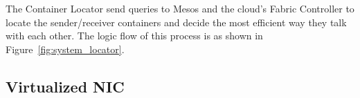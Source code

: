 The Container Locator send queries to Mesos and the cloud's Fabric Controller to locate
the sender/receiver containers and decide the most efficient way they talk with each other.
The logic flow of this process is as shown in Figure~\ref{fig:system_locator}.




\subsection{Virtualized NIC}



